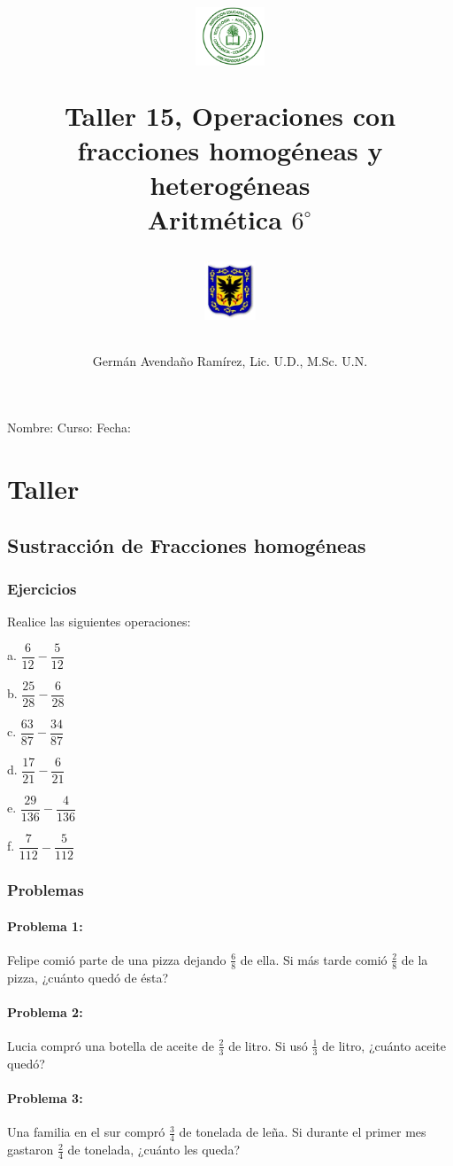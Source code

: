 \documentclass[10pt,twoside]{article}
\author{Germ\'an Avenda\~no Ram\'irez, Lic. U.D., M.Sc. U.N.}
\title{\begin{minipage}{.2\textwidth}
\includegraphics[height=1.75cm]{Images/logo-colegio.png}\end{minipage}
\begin{minipage}{.55\textwidth}
\begin{center}
Taller 15, Operaciones con fracciones homogéneas y heterogéneas \\
Aritmética $6^{\circ}$
\end{center}
\end{minipage}\hfill
\begin{minipage}{.2\textwidth}
\includegraphics[height=1.75cm]{Images/logo-sed.png} 
\end{minipage}}
\date{}
\begin{document}
\maketitle
Nombre: \hrulefill Curso: \underline{\hspace*{44pt}} Fecha: \underline{\hspace*{2.5cm}}
\section*{Taller}
\subsection*{Sustracción de Fracciones homog\'{e}neas}
\subsubsection*{Ejercicios}
Realice las siguientes operaciones:
\begin{enumerate}
\begin{multicols}{3}
\item[a.] $\dfrac{6}{12}-\dfrac{5}{12}$
\item[b.] $\dfrac{25}{28}-\dfrac{6}{28}$
\item[c.] $\dfrac{63}{87}-\dfrac{34}{87}$
\item[d.] $\dfrac{17}{21}-\dfrac{6}{21}$
\item[e.] $\dfrac{29}{136}-\dfrac{4}{136}$
\item[f.] $\dfrac{7}{112}-\dfrac{5}{112}$
\end{multicols}
\end{enumerate}
\subsubsection*{Problemas}
\paragraph*{Problema 1:} Felipe comi\'{o} parte de una pizza dejando $\frac{6}{8}$ de ella. Si m\'{a}s tarde comi\'{o} $\frac{2}{8}$ de la pizza, ¿cu\'{a}nto qued\'{o} de \'{e}sta?
\paragraph*{Problema 2:}
Lucia compró una botella de aceite de $\frac{2}{3}$ de litro. Si usó $\frac{1}{3}$ de litro, ¿cuánto aceite quedó?
\paragraph*{Problema 3:} Una familia en el sur compr\'{o} $\frac{3}{4}$ de tonelada de leña. Si durante el primer mes gastaron $\frac{2}{4}$ de tonelada, ¿cuánto les queda?
\end{document}
